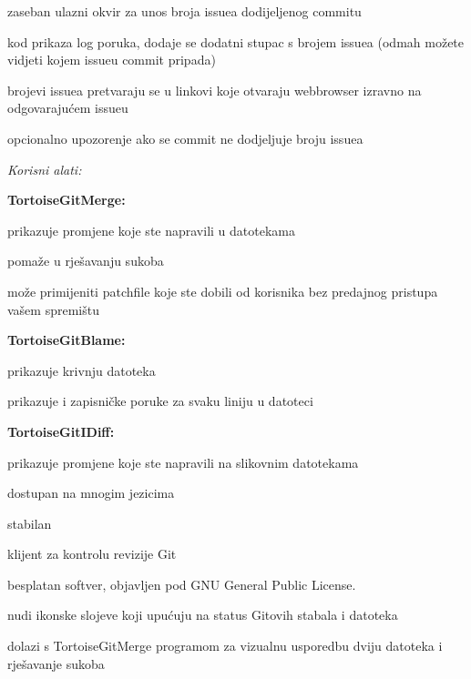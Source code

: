 \begin{frame}[allowframebreaks]
\begin{itemize}
 \item zaseban ulazni okvir za unos broja issuea dodijeljenog commitu 
 \item kod prikaza log poruka, dodaje se dodatni stupac s brojem issuea (odmah možete vidjeti kojem issueu commit pripada)
 \item brojevi issuea pretvaraju se u linkovi koje otvaraju webbrowser izravno na odgovarajućem issueu
 \item opcionalno upozorenje ako se commit ne dodjeljuje broju issuea
 \framebreak
\item \textit{Korisni alati:}
 \item \textbf{TortoiseGitMerge:}
 {\setlength\itemindent{15pt}\item prikazuje promjene koje ste napravili u datotekama}
 {\setlength\itemindent{15pt}\item pomaže u rješavanju sukoba}
 {\setlength\itemindent{15pt}\item može primijeniti patchfile koje ste dobili od korisnika bez predajnog pristupa vašem spremištu}
 \item \textbf{TortoiseGitBlame:}
 {\setlength\itemindent{15pt}\item prikazuje krivnju datoteka}
 {\setlength\itemindent{15pt}\item prikazuje i zapisničke poruke za svaku liniju u datoteci}
 \item \textbf{TortoiseGitIDiff:}
 {\setlength\itemindent{15pt}\item prikazuje promjene koje ste napravili na slikovnim datotekama}
 \framebreak
 \item dostupan na mnogim jezicima
 \item stabilan
 \item klijent za kontrolu revizije Git
 \item besplatan softver, objavljen pod GNU General Public License.
 \item nudi ikonske slojeve koji upućuju na status Gitovih stabala i datoteka
 \item dolazi s TortoiseGitMerge programom za vizualnu usporedbu dviju datoteka i rješavanje sukoba
\end{itemize}
\end{frame}